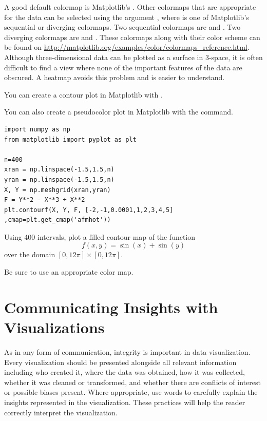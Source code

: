 A good default colormap is Matplotlib's .
Other colormaps that are appropriate for the data can be selected using the argument , where  is one of Matplotlib's sequential or diverging colormaps.
Two sequential colormaps are  and . Two diverging colormaps are  and .
These colormaps along with their color scheme can be found on
\url{http://matplotlib.org/examples/color/colormaps_reference.html}.
Although three-dimensional data can be plotted as a surface in 3-space, it is often difficult to find a view where none of the important features of the data are obscured.
A heatmap avoids this problem and is easier to understand.

You can create a contour plot in Matplotlib with .

You can also create a pseudocolor plot in Matplotlib with the  command.

\begin{lstlisting}
import numpy as np
from matplotlib import pyplot as plt

n=400
xran = np.linspace(-1.5,1.5,n)
yran = np.linspace(-1.5,1.5,n)
X, Y = np.meshgrid(xran,yran)
F = Y**2 - X**3 + X**2
plt.contourf(X, Y, F, [-2,-1,0.0001,1,2,3,4,5] ,cmap=plt.get_cmap('afmhot'))
\end{lstlisting}

\begin{problem} %
Using 400 intervals, plot a filled contour map of the function \[f(x,y) = \sin(x) + \sin(y)\] over the domain $[0,12\pi]\times[0,12\pi]$.

Be sure to use an appropriate color map.
\end{problem}

\section*{Communicating Insights with Visualizations} %

As in any form of communication, integrity is important in data visualization.
Every visualization should be presented alongside all relevant information including who created it, where the data was obtained, how it was collected, whether it was cleaned or transformed, and whether there are conflicts of
interest or possible biases present.
Where appropriate, use words to carefully explain the insights represented
in the visualization.
These practices will help the reader correctly interpret the visualization.

